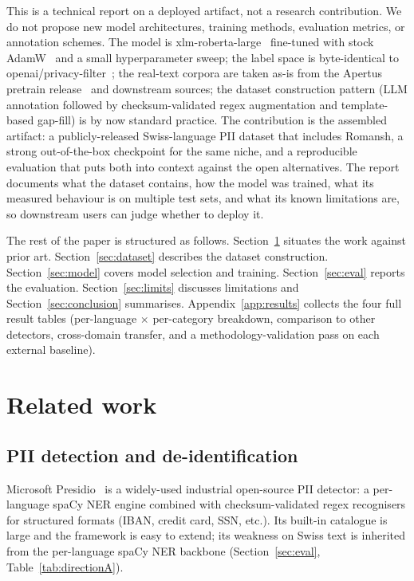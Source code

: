 \documentclass[sigconf,nonacm]{acmart}
\begin{document}
This is a technical report on a deployed artifact, not a research
contribution. We do not propose new model architectures, training
methods, evaluation metrics, or annotation schemes. The model is
\textsf{xlm-roberta-large}~\cite{conneau2020unsupervised} fine-tuned
with stock AdamW~\cite{loshchilov2019decoupled} and a small
hyperparameter sweep; the label space is byte-identical to
\textsf{openai/privacy-filter}~\cite{openai2025privacyfilter}; the
real-text corpora are taken as-is from the Apertus pretrain
release~\cite{apertus2025} and downstream sources; the dataset
construction pattern (LLM annotation followed by checksum-validated
regex augmentation and template-based gap-fill) is by now standard
practice. The contribution is the assembled artifact: a
publicly-released Swiss-language PII dataset that includes Romansh,
a strong out-of-the-box checkpoint for the same niche, and a
reproducible evaluation that puts both into context against the open
alternatives. The report documents what the dataset contains, how
the model was trained, what its measured behaviour is on multiple
test sets, and what its known limitations are, so downstream users
can judge whether to deploy it.

The rest of the paper is structured as follows.
Section~\ref{sec:related} situates the work against prior art.
Section~\ref{sec:dataset} describes the dataset construction.
Section~\ref{sec:model} covers model selection and training.
Section~\ref{sec:eval} reports the evaluation.
Section~\ref{sec:limits} discusses limitations and
Section~\ref{sec:conclusion} summarises.
Appendix~\ref{app:results} collects the four full result tables
(per-language $\times$ per-category breakdown, comparison to other
detectors, cross-domain transfer, and a methodology-validation pass
on each external baseline).

\section{Related work}
\label{sec:related}

\subsection{PII detection and de-identification}

Microsoft Presidio~\cite{microsoft2023presidio} is a widely-used
industrial open-source PII detector: a per-language spaCy NER
engine combined with checksum-validated regex recognisers for
structured formats (IBAN, credit card, SSN, etc.). Its built-in
catalogue is large and the framework is easy to extend; its weakness
on Swiss text is inherited from the per-language spaCy NER
backbone (Section~\ref{sec:eval}, Table~\ref{tab:directionA}).
\end{document}
